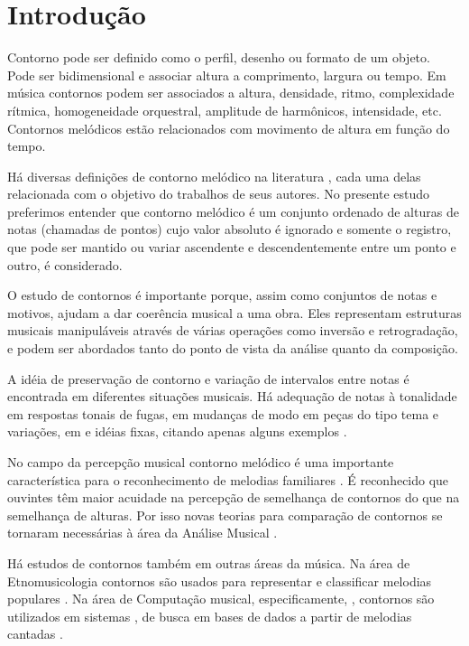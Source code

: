 \section{Introdução}
\label{sec:introducao}

Contorno pode ser definido como o perfil, desenho ou formato de um
objeto. Pode ser bidimensional e associar altura a comprimento,
largura ou tempo. Em música contornos podem ser associados a altura,
densidade, ritmo, complexidade rítmica, homogeneidade orquestral,
amplitude de harmônicos, intensidade, etc. Contornos melódicos estão
relacionados com movimento de altura em função do tempo.

Há diversas definições de contorno melódico na literatura
\cite{piston59:harmony,toch77:shaping,schonberg:fundamentals,adams76:melodic,marvin.ea87:relating,morris87:composition,clifford95:contour,beard03:contour},
cada uma delas relacionada com o objetivo do trabalhos de seus
autores. No presente estudo preferimos entender que contorno melódico
é um conjunto ordenado de alturas de notas (chamadas de pontos) cujo
valor absoluto é ignorado e somente o registro, que pode ser mantido
ou variar ascendente e descendentemente entre um ponto e outro, é
considerado.

O estudo de contornos é importante porque, assim como conjuntos de
notas e motivos, ajudam a dar coerência musical a uma obra. Eles
representam estruturas musicais manipuláveis através de várias
operações como inversão e retrogradação, e podem ser abordados tanto
do ponto de vista da análise quanto da composição.

A idéia de preservação de contorno e variação de intervalos entre
notas é encontrada em diferentes situações musicais. Há adequação de
notas à tonalidade em respostas tonais de fugas, em mudanças de modo
em peças do tipo tema e variações, em  e idéias fixas,
citando apenas alguns exemplos \cite[p. 29]{morris87:composition}.

No campo da percepção musical contorno melódico é uma importante
característica para o reconhecimento de melodias familiares \cite[p.
136]{dowling.ea86:music}. É reconhecido que ouvintes têm maior
acuidade na percepção de semelhança de contornos do que na semelhança
de alturas. Por isso novas teorias para comparação de contornos se
tornaram necessárias à área da Análise Musical
\cite[p. 226]{marvin.ea87:relating}.

Há estudos de contornos também em outras áreas da música. Na área de
Etnomusicologia contornos são usados para representar e classificar
melodias populares \cite{adams76:melodic,kolinski65:structure}. Na
área de Computação musical, especificamente, , contornos são utilizados em sistemas , de busca em bases de dados a partir de melodias cantadas
\cite{ghias.ea95:query}.

